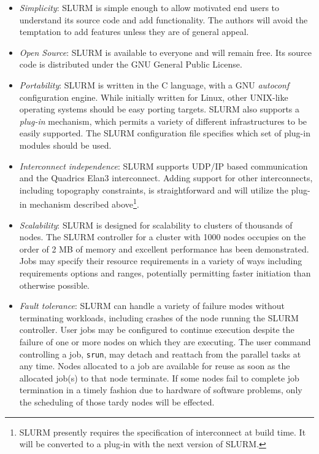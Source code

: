\begin{itemize}
\item {\em Simplicity}: SLURM is simple enough to allow motivated end users
to understand its source code and add functionality.  The authors will 
avoid the temptation to add features unless they are of general appeal. 

\item {\em Open Source}: SLURM is available to everyone and will remain free. 
Its source code is distributed under the GNU General Public 
License\cite{GPL2002}.

\item {\em Portability}: SLURM is written in the C language, with a GNU 
{\em autoconf} configuration engine.  
While initially written for Linux, other UNIX-like operating systems 
should be easy porting targets.
SLURM also supports a {\em plug-in} mechanism, which permits a variety 
of different infrastructures to be easily supported. 
The SLURM configuration file specifies which set of plug-in modules 
should be used. 

\item {\em Interconnect independence}: SLURM supports UDP/IP based
communication and the Quadrics Elan3 interconnect.  Adding support for 
other interconnects, including topography constraints, is straightforward 
and will utilize the plug-in mechanism described above\footnote{SLURM 
presently requires the specification of interconnect at build time. 
It will be converted to a plug-in with the next version of SLURM.}.

\item {\em Scalability}: SLURM is designed for scalability to clusters of
thousands of nodes. The SLURM controller for a cluster with 1000 nodes 
occupies on the order of 2 MB of memory and excellent performance has 
been demonstrated. 
Jobs may specify their resource requirements in a variety of ways 
including requirements options and ranges, potentially permitting 
faster initiation than otherwise possible.

\item {\em Fault tolerance}: SLURM can handle a variety of failure modes
without terminating workloads, including crashes of the node running 
the SLURM controller. 
User jobs may be configured to continue execution despite the failure 
of one or more nodes on which they are executing. 
The user command controlling a job, {\tt srun}, may detach and reattach 
from the parallel tasks at any time. 
Nodes allocated to a job are available for reuse as soon as the allocated 
job(s) to that node terminate. If some nodes fail to complete job termination 
in a timely fashion due to hardware of software problems, only the 
scheduling of those tardy nodes will be effected.


\end{itemize}
